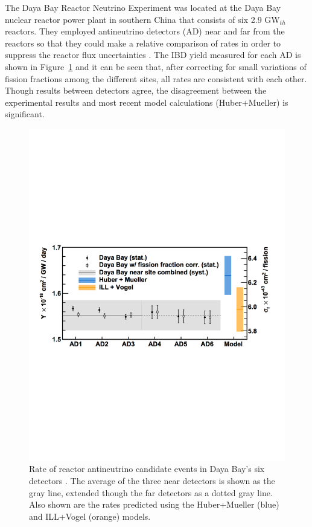 The Daya Bay Reactor Neutrino Experiment was located at the Daya Bay nuclear reactor power plant in southern China that consists of six 2.9 GW$_{th}$ reactors. 
They employed antineutrino detectors (AD) near and far from the reactors so that they could make a relative comparison of rates in order to suppress the reactor flux uncertainties \cite{An:2015qga,DayaBayAnomaly}.
The IBD yield measured for each AD is shown in Figure~\ref{fig:dayabayflux} and it can be seen that, after correcting for small variations of fission fractions among the different sites, all rates are consistent with each other. Though results between detectors agree, the disagreement between the experimental results and most recent model calculations (Huber+Mueller) is significant. 

\begin{figure}[!t]
	\centering
	\includegraphics[width=0.7\linewidth]{tex/3-reactorneutrinos-images/DayaBayFlux}
	\caption[Daya Bay $\bar{\nu_{e}}$ flux.]{Rate of reactor antineutrino candidate events in Daya Bay's six detectors \cite{DayaBayAnomaly}. The average of the three near detectors is shown as the gray line, extended though the far detectors as a dotted gray line. Also shown are the rates predicted using the Huber+Mueller (blue) and ILL+Vogel (orange) models.}
	\label{fig:dayabayflux}
\end{figure}


